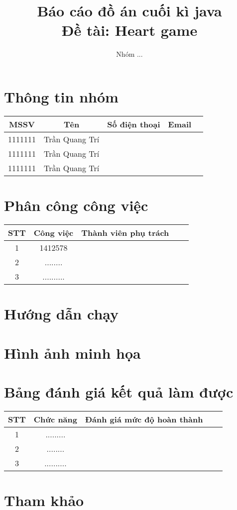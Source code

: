 \documentclass[12pt]{article}
\author{Nhóm ...}
\begin{document}
\title{Báo cáo đồ án cuối kì java\\Đề tài:  Heart game}
\maketitle
\tableofcontents
\pagebreak
\section{Thông tin nhóm}
\begin{tabularx}{\textwidth}{|c|c|c|cX|}
\hline
MSSV & Tên & Số điện thoại & Email \\ \hline
1111111 & Trần Quang Trí &  &  \\
1111111  & Trần Quang Trí &  &  \\
1111111  & Trần Quang Trí &  &  \\
\hline
\end{tabularx}

\section{Phân công công việc}
\begin{tabularx}{\textwidth}{|c|c|c|cX|}
\hline
STT & Công việc & Thành viên phụ trách \\ \hline
1 & 1412578 &    \\
2  & ........ &    \\
3  & .......... &    \\
\hline
\end{tabularx}

\section{Hướng dẫn chạy}

\section{Hình ảnh minh họa}

\section{Bảng đánh giá kết quả làm được}
\begin{tabularx}{\textwidth}{|c|c|c|cX|}
\hline
STT & Chức năng & Đánh giá mức độ hoàn thành \\ \hline
1 & ......... &    \\
2  & ........ &    \\
3  & .......... &    \\
\hline
\end{tabularx}

\section{Tham khảo}
\end{document}

